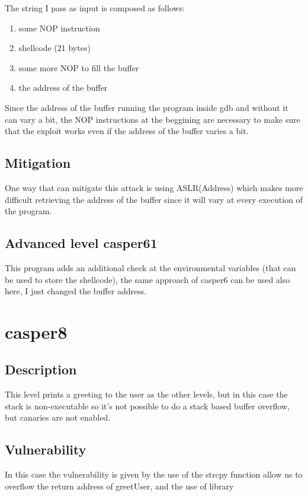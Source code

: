 \documentclass[a4paper,12pt]{article}
\begin{document}
The string I pass as input is composed as follows:
\begin{enumerate}
\item some NOP instruction
\item shellcode (21 bytes)
\item some more NOP to fill the buffer
\item the address of the buffer
\end{enumerate}

Since the address of the buffer running the program inside gdb and without it can vary a bit, the NOP instructions at the beggining are necessary to make sure that the exploit works even if the address of the buffer varies a bit.


\subsection{Mitigation}

One way that can mitigate this attack is using ASLR(Address)
which makes more difficult retrieving the address of the buffer since it will vary at every execution of the program.


\subsection{Advanced level casper61}

This program adds an additional check at the environmental variables (that can be used to store the shellcode), the same approach of casper6 can be used also here, I just changed the buffer address.

\section{casper8}
\subsection{Description}

This level prints a greeting to the user as the other levels, but in this case the stack is non-executable so it's not possible to do a stack based buffer overflow, but canaries are not enabled.

\subsection{Vulnerability}

In this case the vulnerability is given by the use of the strcpy function allow us to overflow the return address of greetUser, and the use of library 
\end{document}
